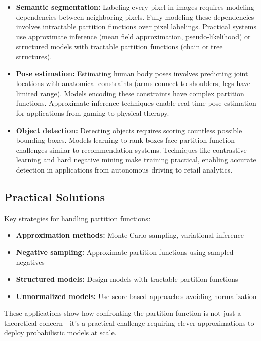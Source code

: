 \begin{itemize}
    \item \textbf{Semantic segmentation:} Labeling every pixel in images requires modeling dependencies between neighboring pixels. Fully modeling these dependencies involves intractable partition functions over pixel labelings. Practical systems use approximate inference (mean field approximation, pseudo-likelihood) or structured models with tractable partition functions (chain or tree structures).
    
    \item \textbf{Pose estimation:} Estimating human body poses involves predicting joint locations with anatomical constraints (arms connect to shoulders, legs have limited range). Models encoding these constraints have complex partition functions. Approximate inference techniques enable real-time pose estimation for applications from gaming to physical therapy.
    
    \item \textbf{Object detection:} Detecting objects requires scoring countless possible bounding boxes. Models learning to rank boxes face partition function challenges similar to recommendation systems. Techniques like contrastive learning and hard negative mining make training practical, enabling accurate detection in applications from autonomous driving to retail analytics.
\end{itemize}

\subsection{Practical Solutions}

Key strategies for handling partition functions:
\begin{itemize}
    \item \textbf{Approximation methods:} Monte Carlo sampling, variational inference
    \item \textbf{Negative sampling:} Approximate partition functions using sampled negatives
    \item \textbf{Structured models:} Design models with tractable partition functions
    \item \textbf{Unnormalized models:} Use score-based approaches avoiding normalization
\end{itemize}

These applications show how confronting the partition function is not just a theoretical concern—it's a practical challenge requiring clever approximations to deploy probabilistic models at scale.

